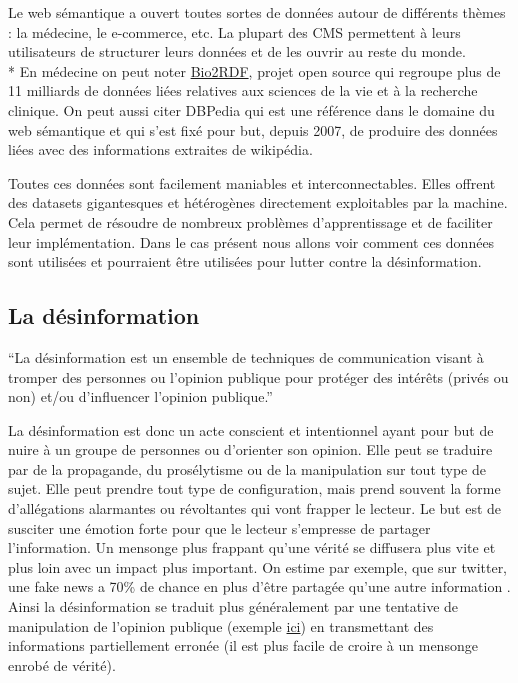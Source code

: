 Le web sémantique a ouvert toutes sortes de données autour de différents thèmes : la médecine, le e-commerce, etc. La plupart des CMS permettent à leurs utilisateurs de structurer leurs données et de les ouvrir au reste du monde.
\\*
En médecine on peut noter \href{http://bio2rdf.org/}{Bio2RDF}, projet open source qui regroupe plus de 11 milliards de données liées relatives aux sciences de la vie et à la recherche clinique. On peut aussi citer DBPedia qui est une référence dans le domaine du web sémantique et qui s'est fixé pour but, depuis 2007, de produire des données liées avec des informations extraites de wikipédia.

Toutes ces données sont facilement maniables et interconnectables. Elles offrent des datasets gigantesques et hétérogènes directement exploitables par la machine. Cela permet de résoudre de nombreux problèmes d'apprentissage et de faciliter leur implémentation. Dans le cas présent nous allons voir comment ces données sont utilisées et pourraient être utilisées pour lutter contre la désinformation.

\subsection{La désinformation}

\enquote{La désinformation est un ensemble de techniques de communication visant à tromper des personnes ou l'opinion publique pour protéger des intérêts (privés ou non) et/ou d'influencer l'opinion publique.} \cite{wiki:desinformation}

La désinformation est donc un acte conscient et intentionnel ayant pour but de nuire à un groupe de personnes ou d'orienter son opinion. Elle peut se traduire par de la propagande, du prosélytisme ou de la manipulation sur tout type de sujet. Elle peut prendre tout type de configuration, mais prend souvent la forme d'allégations alarmantes ou révoltantes qui vont frapper le lecteur. Le but est de susciter une émotion forte pour que le lecteur s'empresse de partager l'information. Un mensonge plus frappant qu'une vérité se diffusera plus vite et plus loin avec un impact plus important. On estime par exemple, que sur twitter, une fake news a 70\% de chance en plus d'être partagée qu'une autre information \cite{vosoughi2017rumor}. 
Ainsi la désinformation se traduit plus généralement par une tentative de manipulation de l'opinion publique (exemple \href{https://www.20minutes.fr/societe/2261439-20180426-video-evacuation-tolbiac-retour-naissance-fake-news}{ici}) en transmettant des informations partiellement erronée (il est plus facile de croire à un mensonge enrobé de vérité). 

